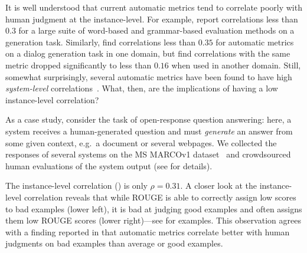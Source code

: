 It is well understood that current automatic metrics tend to correlate poorly with human judgment at the instance-level.
For example, \citet{novikova2017why} report correlations less than $0.3$ for a large suite of word-based and grammar-based evaluation methods on a generation task.
Similarly, \citet{liu2016evaluate} find correlations less than $0.35$ for automatic metrics on a dialog generation task in one domain, but find correlations with the same metric dropped significantly to less than $0.16$ when used in another domain. 
Still, somewhat surprisingly, several automatic metrics have been found to have high \textit{system-level} correlations~\citep{novikova2017why}.
What, then, are the implications of having a low instance-level correlation?  

As a case study, consider the task of open-response question answering:
  here, a system receives a human-generated question and must \textit{generate} an answer from some given context, e.g.\ a document or several webpages.
  We collected the responses of several systems on the MS MARCOv1 dataset~\citep{nguyen2016ms} and crowdsourced human evaluations of the system output
  (see  for details).

The instance-level correlation () is only $\rho = 0.31$.
A closer look at the instance-level correlation reveals that
while ROUGE is able to correctly assign low scores to bad examples (lower left),
it is bad at judging good examples and often assigns them low ROUGE scores (lower right)---see  for examples.
This observation agrees with a finding reported in \citet{novikova2017why} that automatic metrics correlate better with human judgments on bad examples than average or good examples. 


